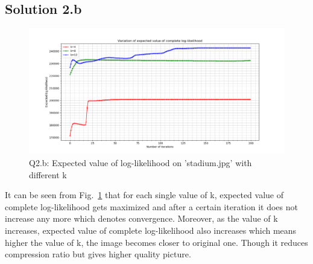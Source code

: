 \subsection*{Solution 2.b}
\begin{figure}[h!]
	\centering
	\includegraphics[scale=0.5]{q2_b_exp_llh}
	\caption{Q2.b: Expected value of log-likelihood on 'stadium.jpg' with different k}
	\label{fig:2b_em_llh}
\end{figure}
It can be seen from Fig.~\ref{fig:2b_em_llh} that for each single value of k, expected value of complete log-likelihood gets maximized and after a certain iteration it does not increase any more which denotes convergence. Moreover, as the value of k increases, expected value of complete log-likelihood also increases which means higher the value of k, the image becomes closer to original one. Though it reduces compression ratio but gives higher quality picture.
